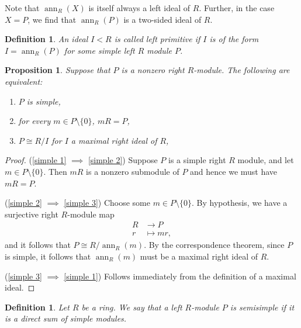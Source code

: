 \documentclass[12pt]{report}
\theoremstyle{plain}
\newtheorem{defn}[thm]{Definition}
\newtheorem{prop}[thm]{Proposition}
\newcommand{\oper}[1]{\operatorname{#1}}
\newcommand{\ann}{\oper{ann}}
\begin{document}
Note that $\ann_R(X)$ is itself always a left ideal of $R$. Further, in the
case $X = P$, we find that $\ann_R(P)$ is a two-sided ideal of $R$.

\begin{defn}
An ideal $I < R$ is called left primitive if $I$ is of the form $I =
\ann_R(P)$ for some simple left $R$ module $P$.
\end{defn}

\begin{prop} \label{simple modules maximal ideals}
Suppose that $P$ is a nonzero right $R$-module. The following are equivalent:
\begin{enumerate}[1. ]
\setlength{\itemsep}{0cm}
\item \label{simple 1} $P$ is simple,
\item \label{simple 2} for every $m \in P\setminus\{0\}$, $mR = P$,
\item \label{simple 3} $P \cong R/I$ for $I$ a maximal right ideal of $R$,
\end{enumerate}
\end{prop}
\begin{proof}
\mbox{}

\noindent
(\ref{simple 1} $\implies$ \ref{simple 2})
Suppose $P$ is a simple right $R$ module, and let $m \in
P\setminus\{0\}$. Then $mR$ is a nonzero submodule of $P$ and hence we must
have $mR = P$. 

\noindent
(\ref{simple 2} $\implies$ \ref{simple 3})
Choose some $m \in P\setminus\{0\}$.
By hypothesis, we have a surjective right $R$-module map
\begin{align*}
R &\to P \\
r &\mapsto mr,
\end{align*}
and it follows that $P \cong R/\ann_R(m)$. By the correspondence theorem,
since $P$ is simple, it follows that $\ann_R(m)$ must be a maximal right
ideal of $R$.

\noindent
(\ref{simple 3} $\implies$ \ref{simple 1})
Follows immediately from the definition of a maximal ideal.
\end{proof}


\begin{defn}
Let $R$ be a ring. We say that a left $R$-module $P$ is semisimple if it is
a direct sum of simple modules.
\end{defn}
\end{document}
